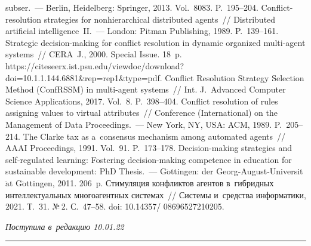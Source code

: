 \begin{multicols}{2}
{{\begin{thebibliography}{99}
subser.~--- Berlin, Heidelberg: Springer, 2013. Vol.~8083. P.~195--204.
   Conflict-resolution strategies 
for nonhierarchical distributed agents~// Distributed artificial intelligence~II.~--- London: Pitman 
Publishing, 1989. P.~139--161. 
   Strategic decision-making for conflict resolution in 
dynamic organized multi-agent systems~// CERA~J., 2000. Special Issue. 18~p. 
{\sf https://citeseerx.ist.psu.edu/viewdoc/\linebreak download?doi=10.1.1.144.6881\&rep=rep1\&type=pdf}.
   Conflict Resolution Strategy Selection Method (ConfRSSM) in 
multi-agent systems~// Int. J.~Advanced Computer Science Applications, 2017. Vol.~8.  
P.~398--404.
   Conflict resolution of rules assigning values to virtual 
attributes~// Conference (International) on the Management of Data Proceedings.~--- New York, 
NY, USA: ACM, 1989. P.~205--214.
   The Clarke tax as a~consensus mechanism among 
automated agents~// AAAI Proceedings, 1991. Vol.~91. P.~173--178.
   Decision-making strategies and self-regulated learning: Fostering  
decision-making competence in education for sustainable development: PhD Thesis.~--- 
G$\ddot{\mbox{o}}$ttingen: der Georg-August-Universit$\ddot{\mbox{a}}$t 
G$\ddot{\mbox{o}}$ttingen, 2011. 206~p.
   Стимуляция конфликтов агентов в~гибридных 
интеллектуальных многоагентных сис\-те\-мах~// Сис\-те\-мы и~средства информатики, 2021. 
Т.~31. №\,2. С.~47--58. doi: 10.14357/ 08696527210205.
\end{thebibliography}

 }
 }

\end{multicols}

\vspace*{-12pt}

\hfill{\small\textit{Поступила в~редакцию 10.01.22}}

\vspace*{6pt}




\hrule

